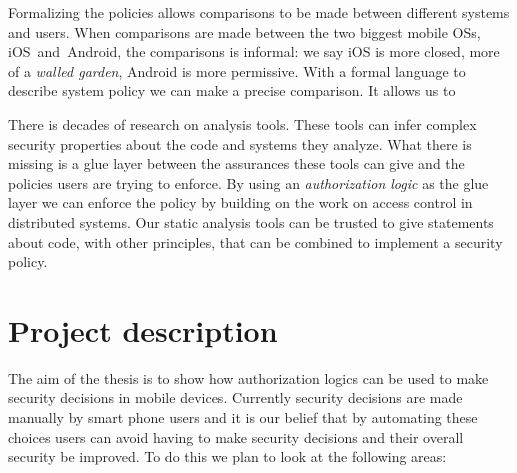 \documentclass[a4paper,12pt,sfsidenotes]{tufte-book}
\begin{document}
Formalizing the policies allows comparisons to be made between different systems
and users.  When comparisons are made between the two biggest mobile OSs,
iOS~and~Android, the comparisons is informal: we say iOS is more closed, more of
a \emph{walled garden}, Android is more permissive.  With a formal language to
describe system policy we can make a precise comparison.  It allows us to 

There is decades of research on analysis tools.  These tools can infer complex
security properties about the code and systems they analyze.  What there is
missing is a glue layer between the assurances these tools can give and the
policies users are trying to enforce.  By using an \emph{authorization logic} as
the glue layer we can enforce the policy by building on the work on access
control in distributed systems.  Our static analysis tools can be trusted to
give statements about code, with other principles, that can be combined to
implement a security policy.


\section{Project description}

The aim of the thesis is to show how authorization logics can be used to make
security decisions in mobile devices.  Currently security decisions are made
manually by smart phone users and it is our belief that by automating these
choices users can avoid having to make security decisions and their overall
security be improved.  To do this we plan to look at the following areas: 
\end{document}
